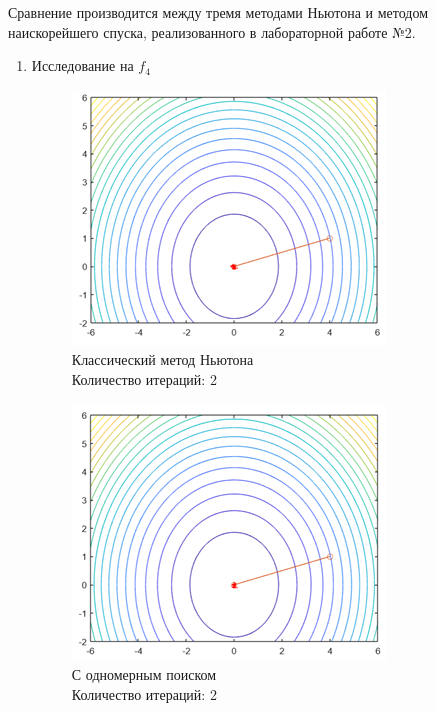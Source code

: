 \documentclass[12pt]{article}
\begin{document}
Сравнение производится между тремя методами Ньютона и методом наискорейшего спуска, реализованного в лабораторной работе №2.

\begin{enumerate}
	\item Исследование на $f_4$

	\begin{figure}[H]
	\begin{minipage}{.5\textwidth}
    	\centering
    	\includegraphics[scale=0.75]{img/f3_1.png}
		\\ Классический метод Ньютона
		\\ Количество итераций: 2
	\end{minipage}
    \begin{minipage}{.5\textwidth}
    \centering
    	\includegraphics[scale=0.75]{img/f3_2.png}
    	\\ С одномерным поиском
    	\\ Количество итераций: 2
    \end{minipage}
    \end{figure}


\end{enumerate}
\end{document}
